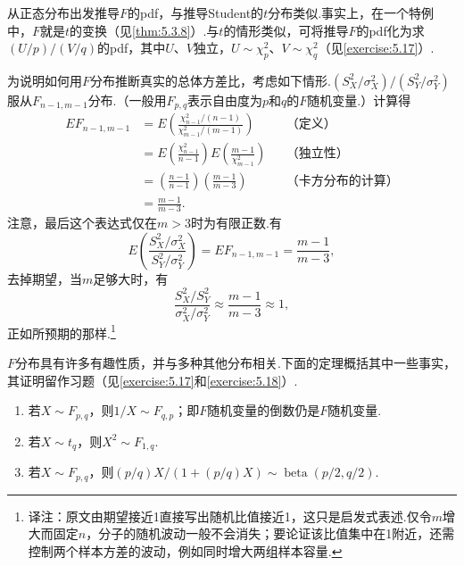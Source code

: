 从正态分布出发推导$F$的pdf，与推导Student的$t$分布类似.事实上，在一个特例中，$F$就是$t$的变换（见\autoref{thm:5.3.8}）.与$t$的情形类似，可将推导$F$的pdf化为求$(U/p)/(V/q)$的pdf，其中$U$、$V$独立，$U\sim\chi_p^2$、$V\sim\chi_q^2$（见\autoref{exercise:5.17}）.
\begin{example}[续\autoref{ex:5.3.5}]\label{ex:5.3.7}
为说明如何用$F$分布推断真实的总体方差比，考虑如下情形.$(S_X^2/\sigma_X^2)/(S_Y^2/\sigma_Y^2)$服从$F_{n-1,m-1}$分布.（一般用$F_{p,q}$表示自由度为$p$和$q$的$F$随机变量.）计算得
\begin{align*}
EF_{n-1,m-1}&=E\left(\frac{\chi_{n-1}^2/(n-1)}{\chi_{m-1}^2/(m-1)}\right)&&\text{（定义）}\\
&=E\left(\frac{\chi_{n-1}^2}{n-1}\right)E\left(\frac{m-1}{\chi_{m-1}^2}\right)&&\text{（独立性）}\\
&=\left(\frac{n-1}{n-1}\right)\left(\frac{m-1}{m-3}\right)&&\text{（卡方分布的计算）}\\
&=\frac{m-1}{m-3}.
\end{align*}
注意，最后这个表达式仅在$m>3$时为有限正数.有
$$E\left(\frac{S_X^2/\sigma_X^2}{S_Y^2/\sigma_Y^2}\right)=EF_{n-1,m-1}=\frac{m-1}{m-3},$$
去掉期望，当$m$足够大时，有
$$\frac{S_X^2/S_Y^2}{\sigma_X^2/\sigma_Y^2}\approx\frac{m-1}{m-3}\approx1,$$
正如所预期的那样.\footnote{译注：原文由期望接近1直接写出随机比值接近1，这只是启发式表述.仅令$m$增大而固定$n$，分子的随机波动一般不会消失；要论证该比值集中在1附近，还需控制两个样本方差的波动，例如同时增大两组样本容量.}
\end{example}
$F$分布具有许多有趣性质，并与多种其他分布相关.下面的定理概括其中一些事实，其证明留作习题（见\autoref{exercise:5.17}和\autoref{exercise:5.18}）.
\begin{theorem}\label{thm:5.3.8}\leavevmode
\begin{enumerate}[label=\textbf{\alph*.}]
\item 若$X\sim F_{p,q}$，则$1/X\sim F_{q,p}$；即$F$随机变量的倒数仍是$F$随机变量.
\item 若$X\sim t_q$，则$X^2\sim F_{1,q}$.
\item 若$X\sim F_{p,q}$，则$(p/q)X/(1+(p/q)X)\sim\operatorname{beta}(p/2,q/2)$.
\end{enumerate}
\end{theorem}
